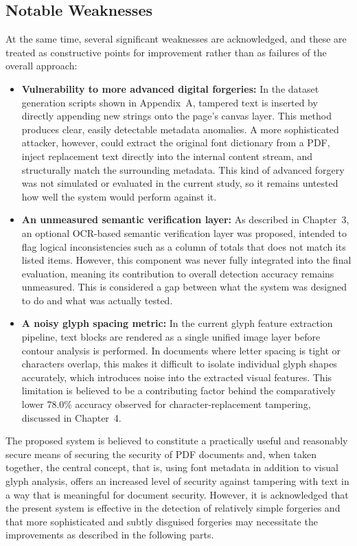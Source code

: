 \subsection{Notable Weaknesses}

At the same time, several significant weaknesses are acknowledged, and these are treated as constructive points for improvement rather than as failures of the overall approach:

\begin{itemize}
    \item \textbf{Vulnerability to more advanced digital forgeries:} In the dataset generation scripts shown in Appendix~A, tampered text is inserted by directly appending new strings onto the page's canvas layer. This method produces clear, easily detectable metadata anomalies. A more sophisticated attacker, however, could extract the original font dictionary from a PDF, inject replacement text directly into the internal content stream, and structurally match the surrounding metadata. This kind of advanced forgery was not simulated or evaluated in the current study, so it remains untested how well the system would perform against it.
    \item \textbf{An unmeasured semantic verification layer:} As described in Chapter~3, an optional OCR-based semantic verification layer was proposed, intended to flag logical inconsistencies such as a column of totals that does not match its listed items. However, this component was never fully integrated into the final evaluation, meaning its contribution to overall detection accuracy remains unmeasured. This is considered a gap between what the system was designed to do and what was actually tested.
    \item \textbf{A noisy glyph spacing metric:} In the current glyph feature extraction pipeline, text blocks are rendered as a single unified image layer before contour analysis is performed. In documents where letter spacing is tight or characters overlap, this makes it difficult to isolate individual glyph shapes accurately, which introduces noise into the extracted visual features. This limitation is believed to be a contributing factor behind the comparatively lower 78.0\% accuracy observed for character-replacement tampering, discussed in Chapter~4.
\end{itemize}

\noindent The proposed system is believed to constitute a practically useful and reasonably secure means of securing the security of PDF documents and, when taken together, the central concept, that is, using font metadata in addition to visual glyph analysis, offers an increased level of security against tampering with text in a way that is meaningful for document security. However, it is acknowledged that the present system is effective in the detection of relatively simple forgeries and that more sophisticated and subtly disguised forgeries may necessitate the improvements as described in the following parts.

